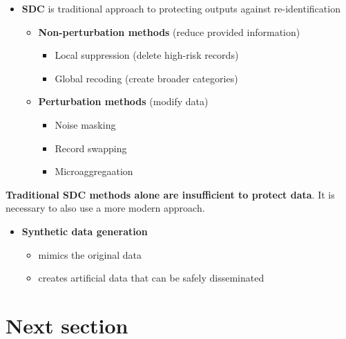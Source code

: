 \documentclass[a0,portrait]{a0poster}
\begin{document}
\begin{multicols}{3}
\begin{itemize}
    \item[\ding{228}]  \textbf{SDC} is traditional approach to protecting outputs against re-identification
        \begin{itemize}
            \item \textbf{Non-perturbation methods} (reduce provided information)
                \begin{itemize}
                    \item Local suppression (delete high-risk records)
                    \item Global recoding (create broader categories)
                \end{itemize}   
            \item \textbf{Perturbation methods} (modify data)
                \begin{itemize}
                    \item Noise masking
                    \item Record swapping
                    \item Microaggregaation
                \end{itemize}             
        \end{itemize}   
\end{itemize}

\textbf{Traditional SDC methods alone are insufficient to protect data}. It is necessary to also use a more modern approach.

\begin{itemize}
     \item[\ding{228}] \textbf{Synthetic data generation}
        \begin{itemize}
            \item mimics the original data
            \item creates artificial data that can be safely disseminated
        \end{itemize}        
\end{itemize}



\section{Next section}


\end{multicols}
\end{document}
